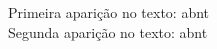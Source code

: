 \renewcommand{\listacronymname}{\hspace*{0.25\textwidth}
\centering\large\textbf{LISTA DE ABREVIATURAS E SIGLAS}}


\printglossary[type=\acronymtype,style=long,title={\listacronymname}]


\noindent
Primeira aparição no texto: \gls{abnt}\\
Segunda aparição no texto: \gls{abnt}
\pagebreak